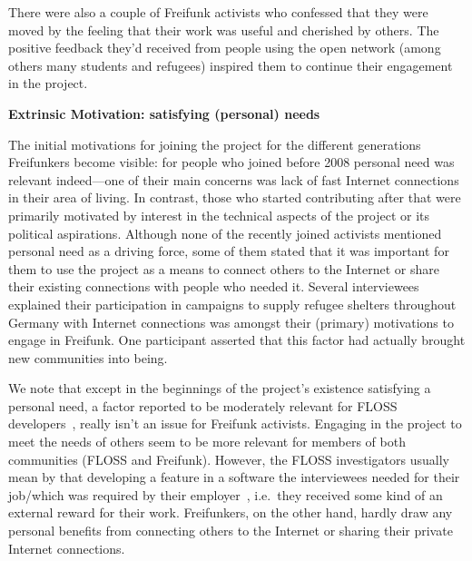 \documentclass{scrartcl}
\begin{document}
There were also a couple of Freifunk activists who confessed that they were moved by the feeling that their work was useful and cherished by others.
The positive feedback they'd received from people using the open network (among others many students and refugees) inspired them to continue their engagement in the project.

\textbf{Extrinsic Motivation: satisfying (personal) needs}

The initial motivations for joining the project for the different generations Freifunkers become visible:
for people who joined before 2008 personal need was relevant indeed---one of their main concerns was lack of fast Internet connections in their area of living.
In contrast, those who started contributing after that were primarily motivated by interest in the technical aspects of the project or its political aspirations.
Although none of the recently joined activists mentioned personal need as a driving force,
some of them stated that it was important for them to use the project as a means to connect others to the Internet or share their existing connections with people who needed it.
Several interviewees explained their participation in campaigns to supply refugee shelters throughout Germany with Internet connections was amongst their (primary) motivations to engage in Freifunk.
One participant asserted that this factor had actually brought new communities into being.

We note that except in the beginnings of the project's existence satisfying a personal need,
a factor reported to be moderately relevant for FLOSS developers~\cite{LakWo2005},
really isn't an issue for Freifunk activists.
Engaging in the project to meet the needs of others seem to be more relevant for members of both communities (FLOSS and Freifunk).
However, the FLOSS investigators usually mean by that developing a feature in a software the interviewees needed for their job/which was required by their employer~\cite{LakWo2005}, i.e.\ they received some kind of an external reward for their work.
Freifunkers, on the other hand, hardly draw any personal benefits from connecting others to the Internet or sharing their private Internet connections.
\end{document}
